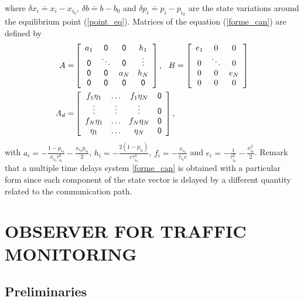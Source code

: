 \documentclass[a4paper, 10pt, onecolumn]{article}
\begin{document}
where $\delta x_i \doteq x_i-x_{i_0}$, $\delta b \doteq b-b_0$ and $\delta p_i
\doteq p_i-p_{i_0}$ are the state variations around the equilibrium point (\ref{point_eq}). Matrices of the equation (\ref{forme_can}) are defined by
\begin{equation*}
\begin{aligned}
A=&\left[\begin{array}{cccc}a_1&\sf{0}&\sf{0}&h_1\\\sf{0}&\ddots&\sf{0}&\vdots\\\sf{0}&\sf{0}&a_N&h_N\\\sf{0}&\sf{0}&\sf{0}&\sf{0}\end{array}\right],~~B=\left[\begin{array}{ccc}e_1&0&0\\0&\ddots&0\\0&0&e_N\\0&0&0\end{array}\right]\\
A_d=&\left[\begin{array}{cccc}f_1\eta_1&\ldots&f_1\eta_N&\sf{0}\\\vdots&\vdots&\vdots&\sf{0}\\f_N\eta_1&\ldots&f_N\eta_N&\sf{0}\\\eta_1&\ldots&\eta_N&\sf{0}\end{array}\right],
\end{aligned}
\end{equation*}
with $a_i=-\frac{1-p_{i_0}}{x_{i_0}\tau^2_{i_0}}-\frac{x_{i_0}p_{i_0}}{2}$, $h_i=-\frac{2(1-p_{i_0})}{c\tau^3_{i_0}}$, $f_i=-\frac{x_{i_0}}{\tau_{i_0}c}$ and $e_i=-\frac{1}{\tau_{i_0}^2}-\frac{x_{i_0}^2}{2}$.
Remark that a multiple time delays system \eqref{forme_can} is obtained with a particular form since each component of the state vector is delayed by a different quantity related to the communication path. 


\section{OBSERVER FOR TRAFFIC MONITORING}

\subsection{Preliminaries}
\end{document}

